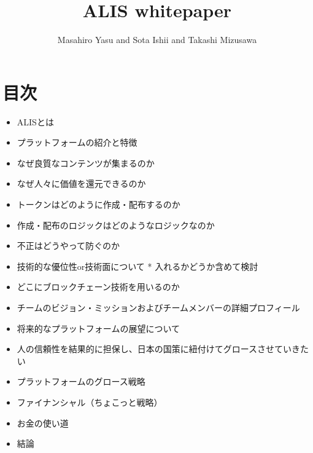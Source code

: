 \documentclass{jsarticle}
\begin{document}
\title{ALIS whitepaper}
\author{Masahiro Yasu and Sota Ishii and Takashi Mizusawa}
\maketitle

\section{目次}
\begin{itemize}
	\item ALISとは
	\item プラットフォームの紹介と特徴
	\item なぜ良質なコンテンツが集まるのか
	\item なぜ人々に価値を還元できるのか
	\item トークンはどのように作成・配布するのか
	\item 作成・配布のロジックはどのようなロジックなのか
	\item 不正はどうやって防ぐのか
	\item 技術的な優位性or技術面について * 入れるかどうか含めて検討
	\item どこにブロックチェーン技術を用いるのか
	\item チームのビジョン・ミッションおよびチームメンバーの詳細プロフィール
	\item 将来的なプラットフォームの展望について
	\item 人の信頼性を結果的に担保し、日本の国策に紐付けてグロースさせていきたい
	\item プラットフォームのグロース戦略
	\item ファイナンシャル（ちょこっと戦略）
	\item お金の使い道
	\item 結論
\end{itemize}
\end{document}
